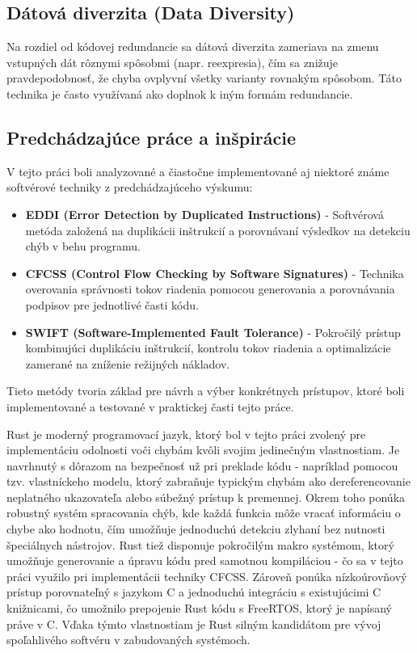\documentclass[12pt, letterpaper]{article}
\begin{document}
\subsection*{Dátová diverzita (Data Diversity)}

Na rozdiel od kódovej redundancie sa dátová diverzita zameriava na zmenu vstupných dát rôznymi spôsobmi (napr. reexpresia), čím sa znižuje pravdepodobnosť, že chyba ovplyvní všetky varianty rovnakým spôsobom. Táto technika je často využívaná ako doplnok k iným formám redundancie.

\subsection*{Predchádzajúce práce a inšpirácie}

V tejto práci boli analyzované a čiastočne implementované aj niektoré známe softvérové techniky z predchádzajúceho výskumu:

\begin{itemize}
\item \textbf{EDDI (Error Detection by Duplicated Instructions)} - Softvérová metóda založená na duplikácii inštrukcií a porovnávaní výsledkov na detekciu chýb v behu programu.
\item \textbf{CFCSS (Control Flow Checking by Software Signatures)} - Technika overovania správnosti tokov riadenia pomocou generovania a porovnávania podpisov pre jednotlivé časti kódu.
\item \textbf{SWIFT (Software-Implemented Fault Tolerance)} - Pokročilý prístup kombinujúci duplikáciu inštrukcií, kontrolu tokov riadenia a optimalizácie zamerané na zníženie režijných nákladov.
\end{itemize}

Tieto metódy tvoria základ pre návrh a výber konkrétnych prístupov, ktoré boli implementované a testované v praktickej časti tejto práce.

Rust je moderný programovací jazyk, ktorý bol v tejto práci zvolený pre implementáciu odolnosti voči chybám kvôli svojim jedinečným vlastnostiam. Je navrhnutý s dôrazom na bezpečnosť už pri preklade kódu - napríklad pomocou tzv. vlastníckeho modelu, ktorý zabraňuje typickým chybám ako dereferencovanie neplatného ukazovateľa alebo súbežný prístup k premennej. Okrem toho ponúka robustný systém spracovania chýb, kde každá funkcia môže vracať informáciu o chybe ako hodnotu, čím umožňuje jednoduchú detekciu zlyhaní bez nutnosti špeciálnych nástrojov. Rust tiež disponuje pokročilým makro systémom, ktorý umožňuje generovanie a úpravu kódu pred samotnou kompiláciou - čo sa v tejto práci využilo pri implementácii techniky CFCSS. Zároveň ponúka nízkoúrovňový prístup porovnateľný s jazykom C a jednoduchú integráciu s existujúcimi C knižnicami, čo umožnilo prepojenie Rust kódu s FreeRTOS, ktorý je napísaný práve v C. Vďaka týmto vlastnostiam je Rust silným kandidátom pre vývoj spoľahlivého softvéru v zabudovaných systémoch.
\end{document}
